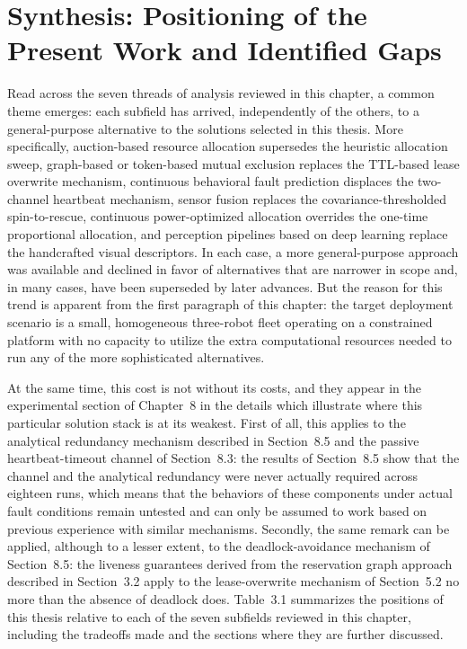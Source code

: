 \section{Synthesis: Positioning of the Present Work and Identified Gaps}

Read across the seven threads of analysis reviewed in this chapter, a common theme emerges: each subfield has arrived, independently of the others, to a general-purpose alternative to the solutions selected in this thesis. More specifically, auction-based resource allocation supersedes the heuristic allocation sweep, graph-based or token-based mutual exclusion replaces the TTL-based lease overwrite mechanism, continuous behavioral fault prediction displaces the two-channel heartbeat mechanism, sensor fusion replaces the covariance-thresholded spin-to-rescue, continuous power-optimized allocation overrides the one-time proportional allocation, and perception pipelines based on deep learning replace the handcrafted visual descriptors. In each case, a more general-purpose approach was available and declined in favor of alternatives that are narrower in scope and, in many cases, have been superseded by later advances. But the reason for this trend is apparent from the first paragraph of this chapter: the target deployment scenario is a small, homogeneous three-robot fleet operating on a constrained platform with no capacity to utilize the extra computational resources needed to run any of the more sophisticated alternatives.

At the same time, this cost is not without its costs, and they appear in the experimental section of Chapter~8 in the details which illustrate where this particular solution stack is at its weakest. First of all, this applies to the analytical redundancy mechanism described in Section~8.5 and the passive heartbeat-timeout channel of Section~8.3: the results of Section~8.5 show that the channel and the analytical redundancy were never actually required across eighteen runs, which means that the behaviors of these components under actual fault conditions remain untested and can only be assumed to work based on previous experience with similar mechanisms. Secondly, the same remark can be applied, although to a lesser extent, to the deadlock-avoidance mechanism of Section~8.5: the liveness guarantees derived from the reservation graph approach described in Section~3.2 apply to the lease-overwrite mechanism of Section~5.2 no more than the absence of deadlock does. Table~3.1 summarizes the positions of this thesis relative to each of the seven subfields reviewed in this chapter, including the tradeoffs made and the sections where they are further discussed.

